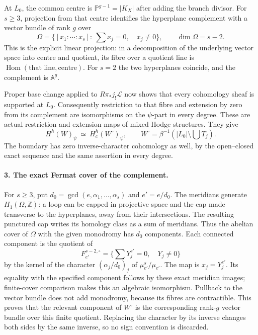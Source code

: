 At $L_0$, the common centre is $\mathbb P^{g-1}=|K_X|$ after
adding the branch divisor. For $s\ge3$, projection from that centre
identifies the hyperplane complement with a vector bundle of rank
$g$ over
\[
 \Omega=\{[x_1:\cdots:x_s]:\ \sum x_j=0,\quad x_j\ne0\},
             \qquad\dim\Omega=s-2.
\]
This is the explicit linear projection: in a decomposition of the
underlying vector space into centre and quotient, its fibre over a
quotient line is $\operatorname{Hom}(\text{that line},\text{centre})$.
For $s=2$ the two hyperplanes coincide, and the complement is
$\mathbb A^g$.

Proper base change applied to $R\pi_*j_!\mathcal L$ now shows that
every cohomology sheaf is supported at $L_0$. Consequently restriction
to that fibre and extension by zero from its complement are
isomorphisms on the $\psi$-part in every degree. These are actual
restriction and extension maps of mixed Hodge structures. They give
\[
 H^h(W)_\psi\ \simeq\ H_c^h(W^\circ)_\psi,
       \qquad W^\circ=\beta^{-1}(|L_0|\setminus\textstyle\bigcup T_j).
                                                        \tag{R01.4}
\]
The boundary has zero inverse-character cohomology as well, by the
open--closed exact sequence and the same assertion in every degree.

\paragraph{3. The exact Fermat cover of the complement.}
For $s\ge3$, put $d_0=\gcd(e,\alpha_1,\ldots,\alpha_s)$ and
$e'=e/d_0$. The meridians generate $H_1(\Omega,\mathbb Z)$: a loop
can be capped in projective space and the cap made transverse to the
hyperplanes, away from their intersections. The resulting punctured
cap writes its homology class as a sum of meridians.
Thus the abelian cover of $\Omega$ with the given monodromy has
$d_0$ components. Each connected component is the quotient of
\[
 F_{e'}^{s-2,\circ}
     =\{\textstyle\sum Y_j^{e'}=0,\quad Y_j\ne0\}
\]
by the kernel of the character $(\alpha_j/d_0)_j$ of
$\mu_{e'}^s/\mu_{e'}$. The map is $x_j=Y_j^{e'}$.
Its equality with the specified component follows by these exact
meridian images; finite-cover comparison makes this an algebraic
isomorphism. Pullback to the vector bundle does not add monodromy,
because its fibres are contractible. This proves that the relevant
component of $W^\circ$ is the corresponding rank-$g$ vector bundle
over this finite quotient. Replacing the character by its inverse
changes both sides by the same inverse, so no sign convention is
discarded.

